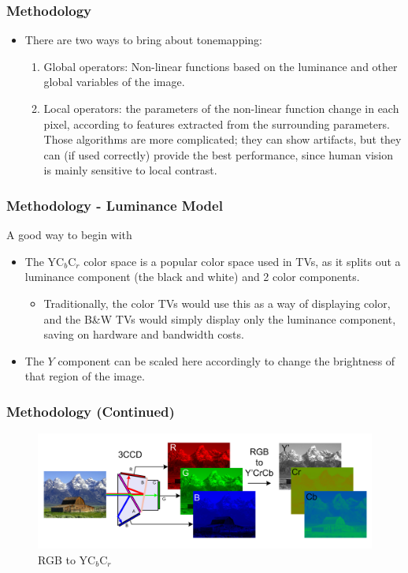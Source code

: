 \documentclass{beamer}
\begin{document}
\begin{frame}
    \frametitle{Methodology}
    \begin{itemize}
        
        \item There are two ways to bring about tonemapping:
        \begin{enumerate}
            \item Global operators: Non-linear functions based on the luminance and other global variables of the image.
            \item Local operators: the parameters of the non-linear function change in each pixel, according to features extracted from the surrounding parameters. Those algorithms are more complicated; they can show artifacts, but they can (if used correctly) provide the best performance, since human vision is mainly sensitive to local contrast.
        \end{enumerate}
    \end{itemize}
    

\end{frame}

\begin{frame}
    \frametitle{Methodology - Luminance Model}
    A good way to begin with
    \begin{itemize}
        \item The YC$_b$C$_r$ color space is a popular color space used in TVs, as it splits out a luminance component (the black and white) and 2 color components.
        \begin{itemize}
            \item Traditionally, the color TVs would use this as a way of displaying color, and the B\&W TVs would simply display only the luminance component, saving on hardware and bandwidth costs.
        \end{itemize} 
        \item The $Y$ component can be scaled here accordingly to change the brightness of that region of the image.
    \end{itemize}
    

\end{frame}

\begin{frame}
    \frametitle{Methodology (Continued)}
            
            \begin{figure}
                \centering
                \includegraphics[width=.85\linewidth]{media/CCD.png}
                \caption{RGB to YC$_b$C$_r$}
            \end{figure}

\end{frame}
\end{document}
